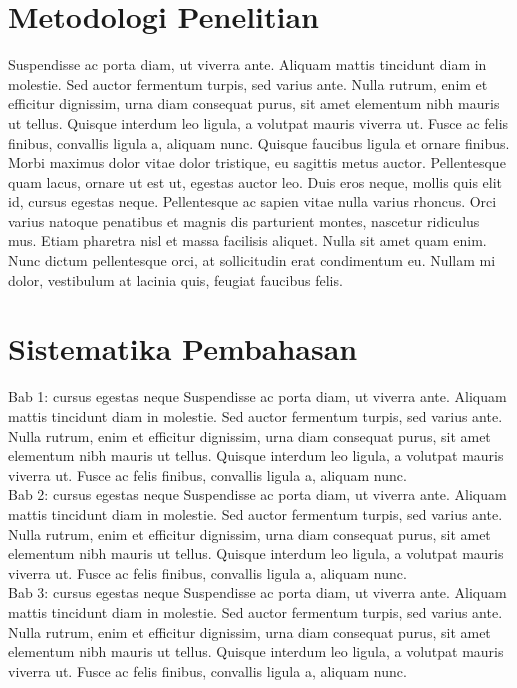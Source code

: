 \section{Metodologi Penelitian}
Suspendisse ac porta diam, ut viverra ante. Aliquam mattis tincidunt diam in molestie. Sed auctor fermentum turpis, sed varius ante. Nulla rutrum, enim et efficitur dignissim, urna diam consequat purus, sit amet elementum nibh mauris ut tellus. Quisque interdum leo ligula, a volutpat mauris viverra ut. Fusce ac felis finibus, convallis ligula a, aliquam nunc. Quisque faucibus ligula et ornare finibus. Morbi maximus dolor vitae dolor tristique, eu sagittis metus auctor. Pellentesque quam lacus, ornare ut est ut, egestas auctor leo. Duis eros neque, mollis quis elit id, cursus egestas neque. Pellentesque ac sapien vitae nulla varius rhoncus. Orci varius natoque penatibus et magnis dis parturient montes, nascetur ridiculus mus. Etiam pharetra nisl et massa facilisis aliquet. Nulla sit amet quam enim. Nunc dictum pellentesque orci, at sollicitudin erat condimentum eu. Nullam mi dolor, vestibulum at lacinia quis, feugiat faucibus felis.\\

\section{Sistematika Pembahasan}
Bab 1: cursus egestas neque
Suspendisse ac porta diam, ut viverra ante. Aliquam mattis tincidunt diam in molestie. Sed auctor fermentum turpis, sed varius ante. Nulla rutrum, enim et efficitur dignissim, urna diam consequat purus, sit amet elementum nibh mauris ut tellus. Quisque interdum leo ligula, a volutpat mauris viverra ut. Fusce ac felis finibus, convallis ligula a, aliquam nunc.\\

Bab 2: cursus egestas neque
Suspendisse ac porta diam, ut viverra ante. Aliquam mattis tincidunt diam in molestie. Sed auctor fermentum turpis, sed varius ante. Nulla rutrum, enim et efficitur dignissim, urna diam consequat purus, sit amet elementum nibh mauris ut tellus. Quisque interdum leo ligula, a volutpat mauris viverra ut. Fusce ac felis finibus, convallis ligula a, aliquam nunc.\\

Bab 3: cursus egestas neque
Suspendisse ac porta diam, ut viverra ante. Aliquam mattis tincidunt diam in molestie. Sed auctor fermentum turpis, sed varius ante. Nulla rutrum, enim et efficitur dignissim, urna diam consequat purus, sit amet elementum nibh mauris ut tellus. Quisque interdum leo ligula, a volutpat mauris viverra ut. Fusce ac felis finibus, convallis ligula a, aliquam nunc.\\

